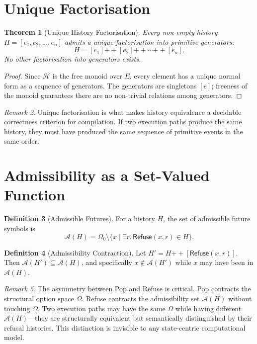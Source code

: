 \documentclass[12pt, a4paper, openany]{book}
\theoremstyle{plain}
\newtheorem{theorem}{Theorem}[chapter]
\theoremstyle{definition}
\newtheorem{definition}[theorem]{Definition}
\theoremstyle{remark}
\newtheorem{remark}[theorem]{Remark}
\newcommand{\Refuse}{\mathsf{Refuse}}
\newcommand{\calH}{\mathcal{H}}
\newcommand{\calA}{\mathcal{A}}
\begin{document}
\section{Unique Factorisation}

\begin{theorem}[Unique History Factorisation]
Every non-empty history $H = [e_1, e_2, \ldots, e_n]$ admits a unique
factorisation into primitive generators:
\[
H = [e_1] \mathbin{++} [e_2] \mathbin{++} \cdots \mathbin{++} [e_n].
\]
No other factorisation into generators exists.
\end{theorem}

\begin{proof}
Since $\calH$ is the free monoid over $E$, every element has a unique normal form
as a sequence of generators. The generators are singletons $[e]$; freeness of the
monoid guarantees there are no non-trivial relations among generators.
\end{proof}

\begin{remark}
Unique factorisation is what makes history equivalence a decidable correctness
criterion for compilation. If two execution paths produce the same history, they
must have produced the same sequence of primitive events in the same order.
\end{remark}

\section{Admissibility as a Set-Valued Function}

\begin{definition}[Admissible Futures]
For a history $H$, the set of admissible future symbols is
\[
\calA(H) = \Omega_0 \setminus \{x \mid \exists r.\, \Refuse(x, r) \in H\}.
\]
\end{definition}

\begin{definition}[Admissibility Contraction]
Let $H' = H \mathbin{++} [\Refuse(x, r)]$. Then $\calA(H') \subseteq \calA(H)$,
and specifically $x \notin \calA(H')$ while $x$ may have been in $\calA(H)$.
\end{definition}

\begin{remark}
The asymmetry between Pop and Refuse is critical. Pop contracts the structural
option space $\Omega$. Refuse contracts the admissibility set $\calA(H)$ without
touching $\Omega$. Two execution paths may have the same $\Omega$ while having
different $\calA(H)$---they are structurally equivalent but semantically
distinguished by their refusal histories. This distinction is invisible to any
state-centric computational model.
\end{remark}
\end{document}
